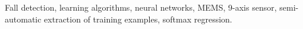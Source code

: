 \documentclass[]{IEEEtran}
\begin{document}
\begin{abstract}
\end{abstract}

\begin{IEEEkeywords} Fall detection, learning algorithms, neural networks, {MEMS}, 9-axis sensor,
semi-automatic extraction of training examples, softmax regression.  \end{IEEEkeywords}

\end{document}
